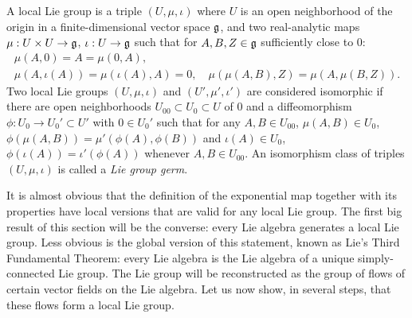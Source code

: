 \begin{defn}
    A local Lie group is a triple $(U,\mu,\iota)$ where $U$ is an open neighborhood of the origin in a finite-dimensional vector space $\mathfrak{g}$, and two real-analytic maps $\mu:U\times U\to\mathfrak{g}$, $\iota:U\to\mathfrak{g}$ such that for $A,B,Z\in\mathfrak{g}$ sufficiently close to $0$:
    \begin{gather}
        \mu(A,0)=A=\mu(0,A),\\
        \mu(A,\iota(A))=\mu(\iota(A),A)=0,\quad \mu(\mu(A,B),Z)=\mu(A,\mu(B,Z)).
    \end{gather}
    Two local Lie groups $(U,\mu,\iota)$ and $(U',\mu',\iota')$ are considered isomorphic if there are open neighborhoods $U_{00}\subset U_0\subset U$ of $0$ and a diffeomorphism $\phi:U_0\to U_0'\subset U'$ with $0\in U_0'$ such that for any $A,B\in U_{00}$, $\mu(A,B)\in U_0$, $\phi(\mu(A,B))=\mu'(\phi(A),\phi(B))$ and $\iota(A)\in U_0$, $\phi(\iota(A))=\iota'(\phi(A))$ whenever $A,B\in U_{00}$. An isomorphism class of triples $(U,\mu,\iota)$ is called a \emph{Lie group germ}.
\end{defn}

It is almost obvious that the definition of the exponential map together with its properties have local versions that are valid for any local Lie group. The first big result of this section will be the converse: every Lie algebra generates a local Lie group. Less obvious is the global version of this statement, known as Lie's Third Fundamental Theorem: every Lie algebra is the Lie algebra of a unique simply-connected Lie group. The Lie group will be reconstructed as the group of flows of certain vector fields on the Lie algebra. Let us now show, in several steps, that these flows form a local Lie group.

